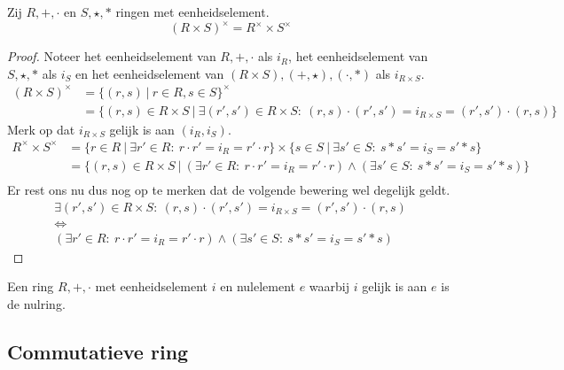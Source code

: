 \documentclass[main.tex]{subfiles}
\begin{document}
\begin{st}
  Zij $R,+,\cdot$ en $S,\star,*$ ringen met eenheidselement.
  \[ (R \times S)^{\times} = R^{\times}\times S^{\times} \]

  \begin{proof}
    Noteer het eenheidselement van $R,+,\cdot$ als $i_{R}$, het eenheidselement van $S,\star,*$ als $i_{S}$ en het eenheidselement van $(R \times S),(+,\star),(\cdot,*)$ als $i_{R \times S}$.
    \[
    \begin{array}{rll}
      (R \times S)^{\times} &= \{ (r,s) \ |\ r \in R, s \in S \}^{\times} &\\
                          &= \{ (r,s) \in R\times S \ |\ \exists (r',s') \in R\times S:\ (r,s) \cdot (r',s') = i_{R \times S} = (r',s') \cdot (r,s) \}
    \end{array}
    \]
    Merk op dat $i_{R\times S}$ gelijk is aan $(i_{R},i_{S})$.
    \[
    \begin{array}{rll}
      R^{\times} \times S^{\times} &= \{ r \in R \ |\ \exists r' \in R:\ r \cdot r' = i_{R} = r' \cdot r \} \times \{ s \in S \ |\ \exists s' \in S:\ s * s' = i_{S} = s' * s \} &\\
                               &= \{ (r,s) \in R \times S \ |\ (\exists r' \in R:\ r \cdot r' = i_{R} = r' \cdot r) \wedge (\exists s' \in S:\ s * s' = i_{S} = s' * s) \} &\\
    \end{array}
    \]
    Er rest ons nu dus nog op te merken dat de volgende bewering wel degelijk geldt.
    \[
    \begin{array}{c}
      \exists (r',s') \in R\times S:\ (r,s) \cdot (r',s') = i_{R \times S} = (r',s') \cdot (r,s)\\
      \Leftrightarrow \\
      (\exists r' \in R:\ r \cdot r' = i_{R} = r' \cdot r) \wedge (\exists s' \in S:\ s * s' = i_{S} = s' * s)
    \end{array}
    \]
  \end{proof}
\end{st}

\begin{st}
  \label{st:nulring-nul-is-een}
  Een ring $R,+,\cdot$ met eenheidselement $i$ en nulelement $e$ waarbij $i$ gelijk is aan $e$ is de nulring.
\end{st}

\subsection{Commutatieve ring}
\label{sec:commutatieve-rin}
\end{document}
